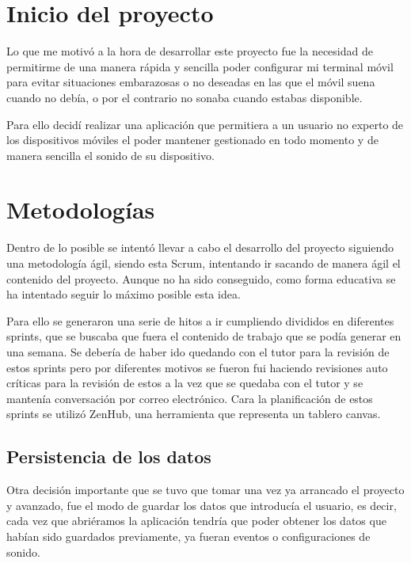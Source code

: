 
\section{Inicio del proyecto}

Lo que me motivó a la hora de desarrollar este proyecto fue la necesidad de permitirme de una manera rápida y sencilla poder configurar mi terminal móvil para evitar situaciones embarazosas o no deseadas en las que el móvil suena cuando no debía, o por el contrario no sonaba cuando estabas disponible.

Para ello decidí realizar una aplicación que permitiera a un usuario no experto de los dispositivos móviles el poder mantener gestionado en todo momento y de manera sencilla el sonido de su dispositivo.

\section{Metodologías}

Dentro de lo posible se intentó llevar a cabo el desarrollo del proyecto siguiendo una metodología ágil, siendo esta Scrum, intentando ir sacando de manera ágil el contenido del proyecto.
Aunque no ha sido conseguido, como forma educativa se ha intentado seguir lo máximo posible esta idea.

Para ello se generaron una serie de hitos a ir cumpliendo divididos en diferentes sprints, que se buscaba que fuera el contenido de trabajo que se podía generar en una semana. Se debería de haber ido quedando con el tutor para la revisión de estos sprints pero por diferentes motivos se fueron fui haciendo revisiones auto críticas para la revisión de estos a la vez que se quedaba con el tutor y se mantenía conversación por correo electrónico.
Cara la planificación de estos sprints se utilizó ZenHub, una herramienta que representa un tablero canvas.

\subsection{Persistencia de los datos}
Otra decisión importante que se tuvo que tomar una vez ya arrancado el proyecto y avanzado, fue el modo de guardar los datos que introducía el usuario, es decir, cada vez que abriéramos la aplicación tendría que poder obtener los datos que habían sido guardados previamente, ya fueran eventos o configuraciones de sonido.

